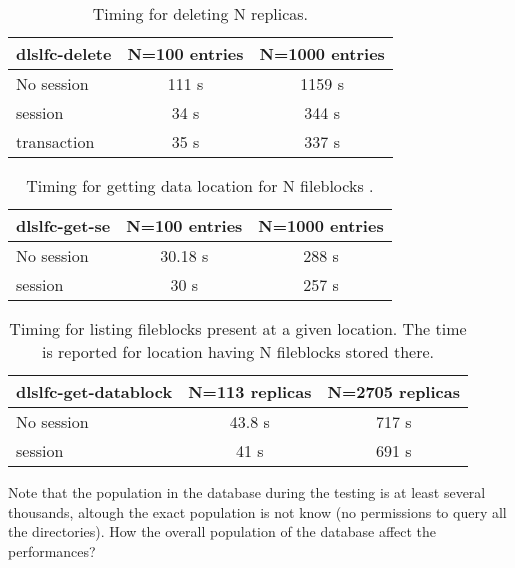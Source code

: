 \documentclass[pdftex]{cmspaper}
\begin{document}
\begin{table}[!htbp]
\begin{center}
 \begin{tabular}{|l|c|c|}         \hline
   {\bf dlslfc-delete}  & N=100 entries & N=1000 entries \\ \hline
 No session          & 111 s     & 1159 s \\ \hline
 session             & 34 s      & 344 s \\ \hline
 transaction         & 35 s      & 337 s \\ \hline        
\end{tabular}
\caption {Timing for deleting N replicas. }\label{dlslfc-del}
\end{center}
\end{table}


\begin{table}[!htbp]
\begin{center}
 \begin{tabular}{|l|c|c|}         \hline
   {\bf dlslfc-get-se}  & N=100 entries & N=1000 entries \\ \hline
 No session          & 30.18 s     & 288 s \\ \hline
 session             & 30 s      & 257 s \\ \hline
\end{tabular}
\caption {Timing for getting data location for N fileblocks .}\label{dlslfc-get-se}
\end{center}
\end{table}

\begin{table}[!htbp]
\begin{center}
 \begin{tabular}{|l|c|c|}         \hline
   {\bf dlslfc-get-datablock}  & N=113 replicas & N=2705 replicas \\ \hline
 No session          & 43.8 s     & 717 s \\ \hline
 session             & 41 s      & 691 s \\ \hline
\end{tabular}
\caption {Timing for listing fileblocks present at a given location. The time is reported for location having N fileblocks stored there. }\label{dlslfc-get-db}
\end{center}
\end{table}

Note that the population in the database during the testing is at least several thousands, 
altough the exact population is not know (no permissions to query all the directories).
How the overall population of the database affect the performances?
\end{document}
